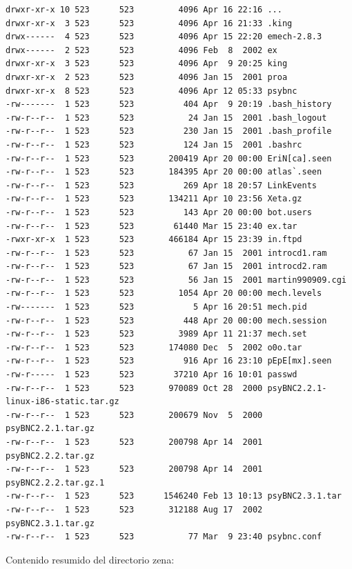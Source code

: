\begin{lstlisting}[style=terminal]
drwxr-xr-x 10 523      523         4096 Apr 16 22:16 ...
drwxr-xr-x  3 523      523         4096 Apr 16 21:33 .king
drwx------  4 523      523         4096 Apr 15 22:20 emech-2.8.3
drwx------  2 523      523         4096 Feb  8  2002 ex
drwxr-xr-x  3 523      523         4096 Apr  9 20:25 king
drwxr-xr-x  2 523      523         4096 Jan 15  2001 proa
drwxr-xr-x  8 523      523         4096 Apr 12 05:33 psybnc
-rw-------  1 523      523          404 Apr  9 20:19 .bash_history
-rw-r--r--  1 523      523           24 Jan 15  2001 .bash_logout
-rw-r--r--  1 523      523          230 Jan 15  2001 .bash_profile
-rw-r--r--  1 523      523          124 Jan 15  2001 .bashrc
-rw-r--r--  1 523      523       200419 Apr 20 00:00 EriN[ca].seen
-rw-r--r--  1 523      523       184395 Apr 20 00:00 atlas`.seen
-rw-r--r--  1 523      523          269 Apr 18 20:57 LinkEvents
-rw-r--r--  1 523      523       134211 Apr 10 23:56 Xeta.gz
-rw-r--r--  1 523      523          143 Apr 20 00:00 bot.users
-rw-r--r--  1 523      523        61440 Mar 15 23:40 ex.tar
-rwxr-xr-x  1 523      523       466184 Apr 15 23:39 in.ftpd
-rw-r--r--  1 523      523           67 Jan 15  2001 introcd1.ram
-rw-r--r--  1 523      523           67 Jan 15  2001 introcd2.ram
-rw-r--r--  1 523      523           56 Jan 15  2001 martin990909.cgi
-rw-r--r--  1 523      523         1054 Apr 20 00:00 mech.levels
-rw-------  1 523      523            5 Apr 16 20:51 mech.pid
-rw-r--r--  1 523      523          448 Apr 20 00:00 mech.session
-rw-r--r--  1 523      523         3989 Apr 11 21:37 mech.set
-rw-r--r--  1 523      523       174080 Dec  5  2002 o0o.tar
-rw-r--r--  1 523      523          916 Apr 16 23:10 pEpE[mx].seen
-rw-r-----  1 523      523        37210 Apr 16 10:01 passwd
-rw-r--r--  1 523      523       970089 Oct 28  2000 psyBNC2.2.1-linux-i86-static.tar.gz
-rw-r--r--  1 523      523       200679 Nov  5  2000 psyBNC2.2.1.tar.gz
-rw-r--r--  1 523      523       200798 Apr 14  2001 psyBNC2.2.2.tar.gz
-rw-r--r--  1 523      523       200798 Apr 14  2001 psyBNC2.2.2.tar.gz.1
-rw-r--r--  1 523      523      1546240 Feb 13 10:13 psyBNC2.3.1.tar
-rw-r--r--  1 523      523       312188 Aug 17  2002 psyBNC2.3.1.tar.gz
-rw-r--r--  1 523      523           77 Mar  9 23:40 psybnc.conf 
\end{lstlisting}

\vspace{1em} 

 Contenido resumido del directorio zena:
 
